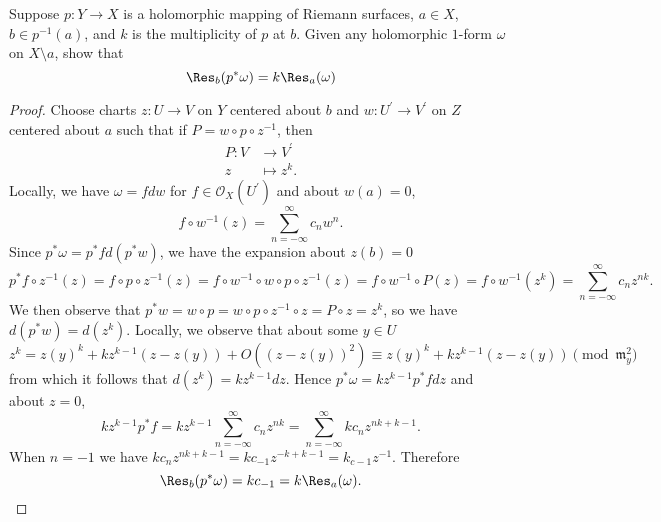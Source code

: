 \documentclass[10pt]{amsart}
\begin{document}
\begin{thm}
  Suppose $p \colon Y \rightarrow X$ is a holomorphic mapping of Riemann surfaces, $a \in X$, $b \in p^{-1}(a)$, and $k$ is the multiplicity of $p$ at $b$.
  Given any holomorphic $1$-form $\omega$ on $X \setminus{a}$, show that 
  $$\Res_b(p^*\omega) = k\Res_a(\omega)$$
  
  \begin{proof}
    Choose charts $z \colon U \rightarrow V$ on $Y$ centered about $b$ and $w \colon U^\prime \rightarrow V^\prime$ on $Z$ centered about $a$ such that if $P = w \circ p \circ z^{-1}$, then
    \begin{align*}
      P \colon V &\rightarrow V^\prime\\
      z &\mapsto z^k.
    \end{align*}
    Locally, we have $\omega = fdw$ for $f \in \mathcal{O}_X(U^\prime)$ and about $w(a) = 0$,
    $$f \circ w^{-1}(z) = \sum_{n = -\infty}^\infty c_n w^n.$$
    Since $p^*\omega = p^*fd(p^*w)$, we have the expansion about $z(b) = 0$
    $$p^*f \circ z^{-1}(z) = f \circ p \circ z^{-1}(z) = f \circ w^{-1} \circ w \circ p \circ z^{-1}(z) = f \circ w^{-1} \circ P(z) = f \circ w^{-1} (z^k) = \sum_{n = -\infty}^\infty c_n z^{nk}.$$
    We then observe that $p^*w = w \circ p = w \circ p \circ z^{-1} \circ z = P \circ z = z^{k}$, so we have $d(p^*w) = d(z^k)$.
    Locally, we observe that about some $y \in U$
    $$z^k = z(y)^k + kz^{k-1}(z - z(y)) + O((z - z(y))^2) \equiv z(y)^k + kz^{k-1}(z - z(y)) \pmod{\mathfrak{m}_y^2}$$
    from which it follows that $d(z^k) = kz^{k-1}dz$.
    Hence $p^*\omega = kz^{k-1}p^*fdz$ and about $z = 0$, 
    $$kz^{k-1}p^*f = kz^{k-1}\sum_{n = -\infty}^\infty c_n z^{nk} = \sum_{n = -\infty}^\infty kc_n z^{nk + k - 1}.$$
    When $n = -1$ we have $kc_nz^{nk + k - 1} = kc_{-1}z^{-k + k - 1} = k_{c - 1}z^{-1}$.
    Therefore
    $$\Res_b(p^*\omega) = kc_{-1} = k\Res_a(\omega).$$
  \end{proof}
\end{thm}
\end{document}

